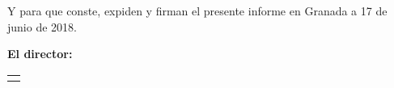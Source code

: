 \vspace{0.5cm}

Y para que conste, expiden y firman el presente informe en Granada a 17 de junio de 2018.

\vspace{1cm}

\textbf{El director:}

\vspace{5cm}


\begin{table}
	\begin{minipage}{.4\textwidth}
		\centering
		\begin{tabular}{c}
			\\ \hline 
			\textbf{\myProf}\\
		\end{tabular}
	\end{minipage}
\end{table}